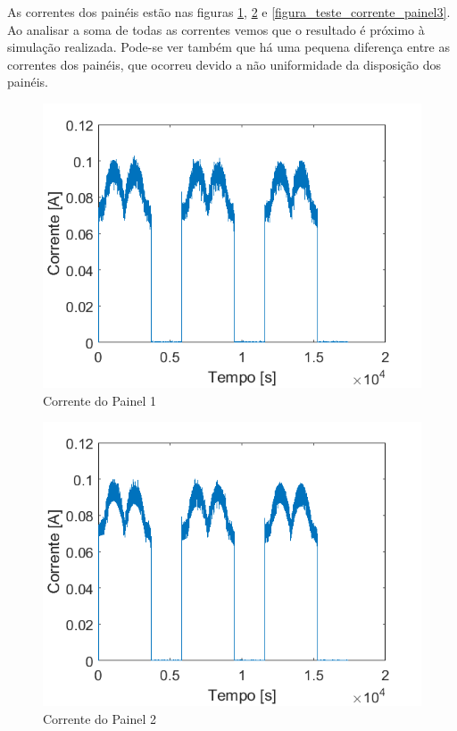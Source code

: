 As correntes dos painéis estão nas figuras \ref{figura_teste_corrente_painel1}, \ref{figura_teste_corrente_painel2} e \ref{figura_teste_corrente_painel3}. Ao analisar a soma de todas as correntes vemos que o resultado é próximo à simulação realizada. Pode-se ver também que há uma pequena diferença entre as correntes dos painéis, que ocorreu devido a não uniformidade da disposição dos painéis.

\begin{figure}[!htpb]
\begin{center}
\includegraphics[scale=0.5]{figures/testPanel1Current.png}
\caption{Corrente do Painel 1}
\label{figura_teste_corrente_painel1}
\end{center}
\end{figure}

\begin{figure}[!htpb]
\begin{center}
\includegraphics[scale=0.5]{figures/testPanel2Current.png}
\caption{Corrente do Painel 2}
\label{figura_teste_corrente_painel2}
\end{center}
\end{figure}

